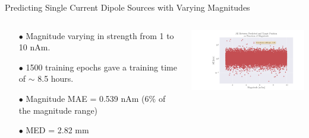 \documentclass[aspectratio=169, 9pt]{beamer}
\begin{document}
\begin{frame}{Predicting Single Current Dipole Sources with Varying Magnitudes}
  \begin{columns}
    \begin{column}{0.5\textwidth}
      \begin{itemize}
          \item[$\bullet$] Magnitude varying in strength from 1 to 10 nAm.
          \item[$\bullet$] 1500 training epochs gave a training time of $\sim$ 8.5 hours.

          \item[$\bullet$] Magnitude MAE = 0.539 nAm (6$\%$ of the magnitude range)
          \item[$\bullet$] MED = 2.82 mm
    \end{itemize}
    \end{column}
    \begin{column}{0.5\textwidth}
      \vskip 0.5cm
      \includegraphics[width=7cm]{figures/mae_amplitude0.pdf}
    \end{column}
  \end{columns}
\end{frame}
\end{document}
